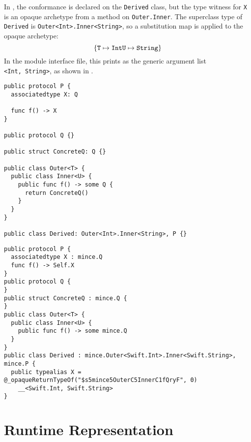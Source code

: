\documentclass[../generics]{subfiles}
\begin{document}
\begin{example}
In , the conformance is declared on the \texttt{Derived} class, but the type witness for \texttt{X} is an opaque archetype from a method on \texttt{Outer.Inner}. The superclass type of \texttt{Derived} is \texttt{Outer<Int>.Inner<String>}, so a substitution map is applied to the opaque archetype:
\[
\{
\texttt{T} \mapsto \texttt{Int}\\
\texttt{U} \mapsto \texttt{String}
\}
\]
In the module interface file, this prints as the generic argument list \texttt{<Int,~String>}, as shown in .
\end{example}
\begin{listing}\label{substituted opaque archetype reference}
\begin{Verbatim}
public protocol P {
  associatedtype X: Q

  func f() -> X
}

public protocol Q {}

public struct ConcreteQ: Q {}

public class Outer<T> {
  public class Inner<U> {
    public func f() -> some Q {
      return ConcreteQ()
    }
  }
}

public class Derived: Outer<Int>.Inner<String>, P {}
\end{Verbatim}
\end{listing}
\begin{listing}\label{substituted opaque archetype reference interface}
\begin{Verbatim}
public protocol P {
  associatedtype X : mince.Q
  func f() -> Self.X
}
public protocol Q {
}
public struct ConcreteQ : mince.Q {
}
public class Outer<T> {
  public class Inner<U> {
    public func f() -> some mince.Q
  }
}
public class Derived : mince.Outer<Swift.Int>.Inner<Swift.String>, mince.P {
  public typealias X = @_opaqueReturnTypeOf("$s5mince5OuterC5InnerC1fQryF", 0)
    __<Swift.Int, Swift.String>
}
\end{Verbatim}
\end{listing}

\section[]{Runtime Representation}
\end{document}
